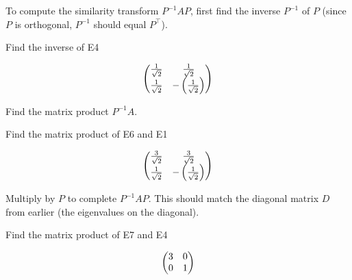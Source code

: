 \documentclass[dvipdfmx]{article}
\begin{document}
To compute the similarity transform $P^{-1}AP$, first find the inverse $P^{-1}$ of $P$ (since $P$ is orthogonal, $P^{-1}$ should equal $P^\top$).

Find the inverse of E4

\begin{equation}
  \ifx\endpmatrix\undefined\pmatrix{\else\begin{pmatrix}\fi \frac{1}{\sqrt{2}}&\frac{1}{\sqrt{2}}\cr \frac{1}{\sqrt{2}}&-\left(\frac{1}{\sqrt{2}}\right)\cr \ifx\endpmatrix\undefined}\else\end{pmatrix}\fi
  \label{eq:E6}
\end{equation}

Find the matrix product $P^{-1}A$.

Find the matrix product of E6 and E1

\begin{equation}
  \ifx\endpmatrix\undefined\pmatrix{\else\begin{pmatrix}\fi \frac{3}{\sqrt{2}}&\frac{3}{\sqrt{2}}\cr \frac{1}{\sqrt{2}}&-\left(\frac{1}{\sqrt{2}}\right)\cr \ifx\endpmatrix\undefined}\else\end{pmatrix}\fi
  \label{eq:E7}
\end{equation}

Multiply by $P$ to complete $P^{-1}AP$. This should match the diagonal matrix $D$ from earlier (the eigenvalues on the diagonal).

Find the matrix product of E7 and E4

\begin{equation}
  \ifx\endpmatrix\undefined\pmatrix{\else\begin{pmatrix}\fi 3&0\cr 0&1\cr \ifx\endpmatrix\undefined}\else\end{pmatrix}\fi
  \label{eq:E8}
\end{equation}
\end{document}
